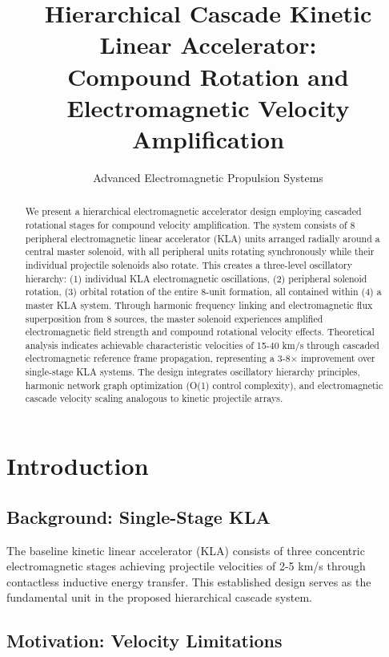 \documentclass[12pt,a4paper]{article}
\title{Hierarchical Cascade Kinetic Linear Accelerator:\\
Compound Rotation and Electromagnetic Velocity Amplification}
\author{Advanced Electromagnetic Propulsion Systems}
\begin{document}
\maketitle

\begin{abstract}
We present a hierarchical electromagnetic accelerator design employing cascaded rotational stages for compound velocity amplification. The system consists of 8 peripheral electromagnetic linear accelerator (KLA) units arranged radially around a central master solenoid, with all peripheral units rotating synchronously while their individual projectile solenoids also rotate. This creates a three-level oscillatory hierarchy: (1) individual KLA electromagnetic oscillations, (2) peripheral solenoid rotation, (3) orbital rotation of the entire 8-unit formation, all contained within (4) a master KLA system. Through harmonic frequency linking and electromagnetic flux superposition from 8 sources, the master solenoid experiences amplified electromagnetic field strength and compound rotational velocity effects. Theoretical analysis indicates achievable characteristic velocities of 15-40 km/s through cascaded electromagnetic reference frame propagation, representing a 3-8× improvement over single-stage KLA systems. The design integrates oscillatory hierarchy principles, harmonic network graph optimization (O(1) control complexity), and electromagnetic cascade velocity scaling analogous to kinetic projectile arrays.
\end{abstract}

\section{Introduction}

\subsection{Background: Single-Stage KLA}

The baseline kinetic linear accelerator (KLA) consists of three concentric electromagnetic stages achieving projectile velocities of 2-5 km/s through contactless inductive energy transfer. This established design serves as the fundamental unit in the proposed hierarchical cascade system.

\subsection{Motivation: Velocity Limitations}
\end{document}

